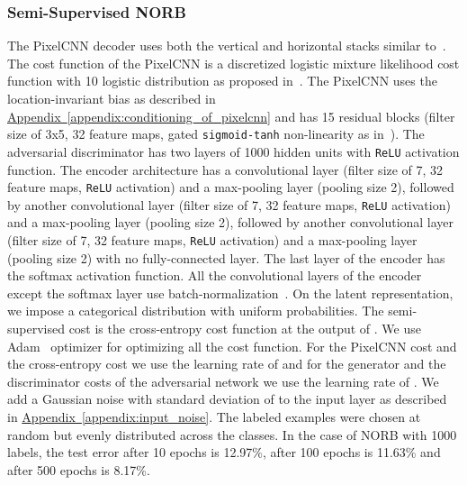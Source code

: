 \documentclass{article}
\newcommand{\myappendix}[1]{\hyperref[appendix:#1]{Appendix~\ref*{appendix:#1}}}
\begin{document}
\begin{appendices}
\subsubsection{Semi-Supervised NORB}\label{appendix:semi-norb}
The PixelCNN decoder uses both the vertical and horizontal stacks similar to~\citep{pixelcnn}. The cost function of the PixelCNN is a discretized logistic mixture likelihood cost function with 10 logistic distribution as proposed in~\citep{pixelcnn++}.
The PixelCNN uses the location-invariant bias as described in \myappendix{conditioning_of_pixelcnn} and has 15 residual blocks (filter size of 3x5, 32 feature maps, gated \texttt{sigmoid-tanh} non-linearity as in~\citep{pixelcnn}).
The adversarial discriminator has two layers of 1000 hidden units with \texttt{ReLU} activation function. 
The encoder architecture has a convolutional layer (filter size of 7, 32 feature maps, \texttt{ReLU} activation) and a max-pooling layer (pooling size 2), followed by another convolutional layer (filter size of 7, 32 feature maps, \texttt{ReLU} activation) and a max-pooling layer (pooling size 2), followed by another convolutional layer (filter size of 7, 32 feature maps, \texttt{ReLU} activation) and a max-pooling layer (pooling size 2) with no fully-connected layer. The last layer of the encoder  has the softmax activation function. 
All the convolutional layers of the encoder except the softmax layer use batch-normalization~\citep{batch}. 
On the latent representation, we impose a categorical distribution with uniform probabilities. 
The semi-supervised cost is the cross-entropy cost function at the output of . We use Adam~\citep{Adam} optimizer for optimizing all the cost function. 
For the PixelCNN cost and the cross-entropy cost we use the learning rate of  and for the generator and the discriminator costs of the adversarial network we use the learning rate of . 
We add a Gaussian noise with standard deviation of  to the input layer as described in \myappendix{input_noise}.
The labeled examples were chosen at random but evenly distributed across the classes. In the case of NORB with 1000 labels, the test error after 10 epochs is 12.97\%, after 100 epochs is 11.63\% and after 500 epochs is 8.17\%.

\end{appendices}
\end{document}
